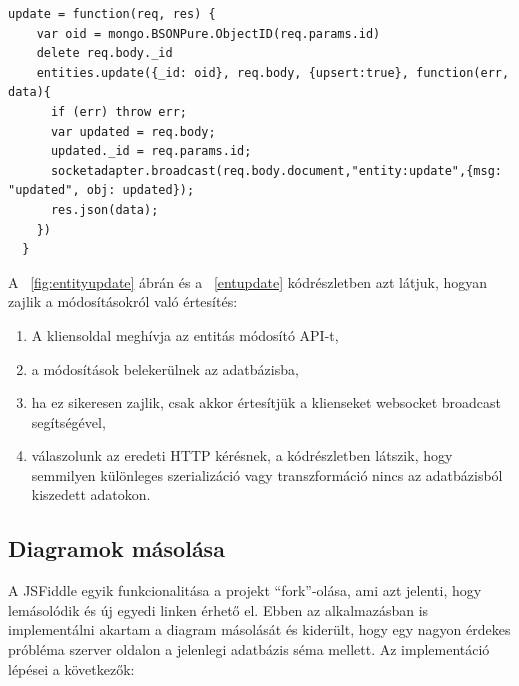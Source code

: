 \begin{lstlisting}[caption=Entitás módosítás feldolgozása szerveroldalon, label=entupdate]
update = function(req, res) {
    var oid = mongo.BSONPure.ObjectID(req.params.id)
    delete req.body._id
    entities.update({_id: oid}, req.body, {upsert:true}, function(err, data){
      if (err) throw err;
      var updated = req.body;
      updated._id = req.params.id;
      socketadapter.broadcast(req.body.document,"entity:update",{msg: "updated", obj: updated});
      res.json(data);
    })
  }
\end{lstlisting}

A ~\ref{fig:entityupdate} ábrán és a ~\ref{entupdate} kódrészletben azt látjuk, hogyan zajlik a módosításokról való értesítés:

\begin{enumerate}
\item A kliensoldal meghívja az entitás módosító API-t,
\item a módosítások belekerülnek az adatbázisba,
\item ha ez sikeresen zajlik, csak akkor értesítjük a klienseket websocket broadcast segítségével, 
\item válaszolunk az eredeti HTTP kérésnek, a kódrészletben látszik, hogy semmilyen különleges szerializáció vagy transzformáció nincs az adatbázisból kiszedett adatokon.
\end{enumerate}


\subsection{Diagramok másolása}

A JSFiddle egyik funkcionalitása a projekt ``fork''-olása, ami azt jelenti, hogy lemásolódik és új egyedi linken érhető el. Ebben az alkalmazásban is implementálni akartam a diagram másolását és kiderült, hogy egy nagyon érdekes próbléma szerver oldalon a jelenlegi adatbázis séma mellett. Az implementáció lépései a következők:

